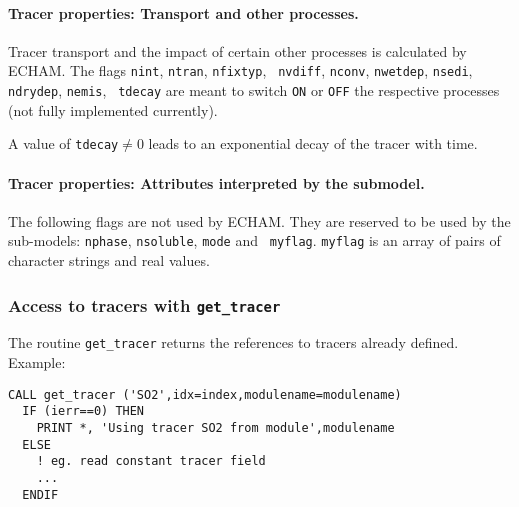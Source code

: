 \paragraph{Tracer properties: Transport and other processes.}

Tracer transport and the impact of certain other processes is
calculated by ECHAM. The flags {\tt nint}, {\tt ntran}, {\tt nfixtyp}, {\tt
nvdiff}, {\tt nconv}, {\tt nwetdep}, {\tt nsedi}, {\tt ndrydep}, {\tt nemis}, {\tt
tdecay} are meant to switch {\tt ON} or {\tt OFF} the
respective processes (not fully implemented currently).

A value of {\tt tdecay}$\ne 0$ leads to an exponential decay of the
tracer with time.

\paragraph{Tracer properties: Attributes interpreted by the submodel.}



The following flags are not used by ECHAM. They are reserved to be
used by the sub-models: {\tt nphase}, {\tt nsoluble}, {\tt mode} and {\tt
  myflag}.  
{\tt myflag} is
an array of pairs of character strings and real values.

\subsubsection{Access to tracers with {\tt get\_tracer}}

The routine {\tt get\_tracer} returns the
references to tracers 
already defined.\\

Example:
\begin{lstlisting}[caption=get\_tracer]
  CALL get_tracer ('SO2',idx=index,modulename=modulename)
  IF (ierr==0) THEN
    PRINT *, 'Using tracer SO2 from module',modulename
  ELSE
    ! eg. read constant tracer field
    ...
  ENDIF
\end{lstlisting}


